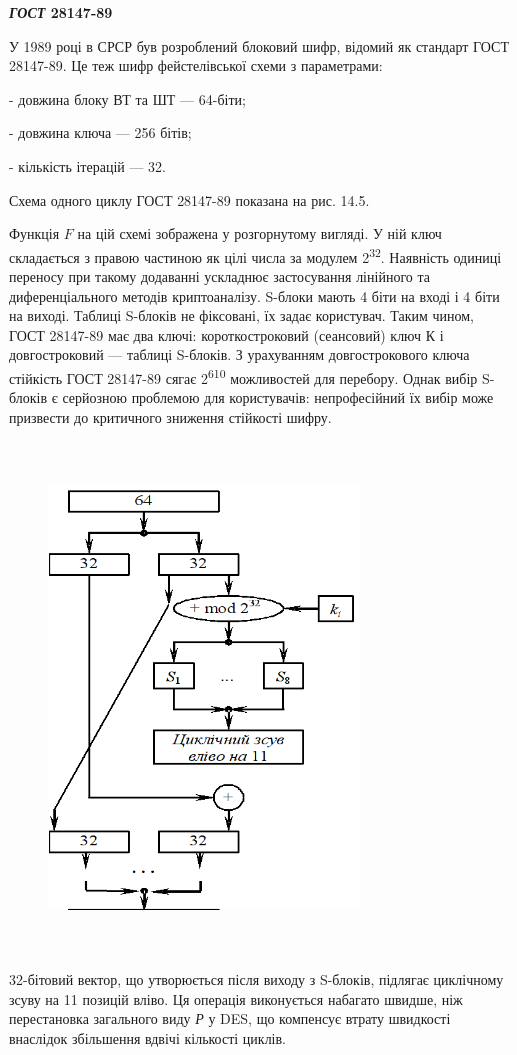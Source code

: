 \bigskip


\bigskip

{\centering\bfseries
\textit{ГОСТ }28147-89
\par}


\bigskip

У 1989 році в СРСР був розроблений блоковий шифр, відомий як стандарт ГОСТ
28147-89. Це теж шифр фейстелівської схеми з параметрами:

 {}- довжина блоку ВТ та ШТ --- 64-біти; 

 {}-  довжина ключа --- 256 бітів;

 {}-  кількість ітерацій --- 32.

 Схема одного циклу\textit{ }ГОСТ\textit{ }28147-89 показана на рис. 14.5. 

Функція  $F$ на цій схемі зображена  у розгорнутому вигляді. У ній ключ
складається з правою частиною як цілі числа за модулем 2\textsuperscript{32}.
Наявність одиниці переносу при такому додаванні ускладнює застосування
лінійного та диференціального методів криптоаналізу. S-блоки мають 4 біти на
вході і 4 біти на  виході. Таблиці S-блоків не фіксовані, їх задає користувач.
Таким чином, ГОСТ 28147-89 має два ключі: короткостроковий (сеансовий) ключ К і
довгостроковий --- таблиці S-блоків. З урахуванням довгострокового ключа
стійкість ГОСТ 28147-89 сягає  2\textsuperscript{610 } можливостей  для 
перебору.  Однак вибір S-блоків є серйозною проблемою для користувачів:
непрофесійний їх вибір може призвести до критичного зниження стійкості шифру.

\begin{figure}
\centering
\includegraphics[width=3.2319in,height=5.3154in]{crypt-img/crypt-img298.png}
\end{figure}
32-бітовий вектор, що утворюється після виходу з S-блоків, підлягає циклічному
зсуву на 11 позицій вліво. Ця операція виконується набагато швидше, ніж
перестановка загального виду \textit{Р} у DES, що компенсує втрату швидкості
внаслідок збільшення вдвічі кількості циклів.

